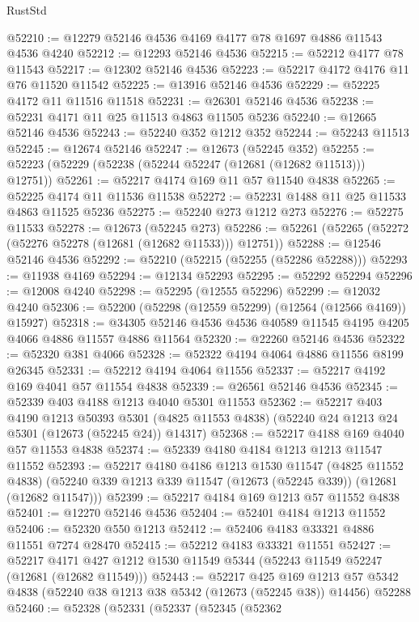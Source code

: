 \begin{lexlean}{RustStd}
\begin{coremodule}
@52210 := @12279 @52146 @4536 @4169 @4177 @78 @1697 @4886 @11543 @4536 @4240
@52212 := @12293 @52146 @4536
@52215 := @52212 @4177 @78 @11543
@52217 := @12302 @52146 @4536
@52223 := @52217 @4172 @4176 @11 @76 @11520 @11542
@52225 := @13916 @52146 @4536
@52229 := @52225 @4172 @11 @11516 @11518
@52231 := @26301 @52146 @4536
@52238 := @52231 @4171 @11 @25 @11513 @4863 @11505 @5236
@52240 := @12665 @52146 @4536
@52243 := @52240 @352 @1212 @352
@52244 := @52243 @11513
@52245 := @12674 @52146
@52247 := @12673 (@52245 @352)
@52255 := @52223 (@52229 (@52238 (@52244 @52247 (@12681 (@12682 @11513))) @12751))
@52261 := @52217 @4174 @169 @11 @57 @11540 @4838
@52265 := @52225 @4174 @11 @11536 @11538
@52272 := @52231 @1488 @11 @25 @11533 @4863 @11525 @5236
@52275 := @52240 @273 @1212 @273
@52276 := @52275 @11533
@52278 := @12673 (@52245 @273)
@52286 := @52261 (@52265 (@52272 (@52276 @52278 (@12681 (@12682 @11533))) @12751))
@52288 := @12546 @52146 @4536
@52292 := @52210 (@52215 (@52255 (@52286 @52288)))
@52293 := @11938 @4169
@52294 := @12134 @52293
@52295 := @52292 @52294
@52296 := @12008 @4240
@52298 := @52295 (@12555 @52296)
@52299 := @12032 @4240
@52306 := @52200 (@52298 (@12559 @52299) (@12564 (@12566 @4169)) @15927)
@52318 := @34305 @52146 @4536 @4536 @40589 @11545 @4195 @4205 @4066 @4886 @11557 @4886 @11564
@52320 := @22260 @52146 @4536
@52322 := @52320 @381 @4066
@52328 := @52322 @4194 @4064 @4886 @11556 @8199 @26345
@52331 := @52212 @4194 @4064 @11556
@52337 := @52217 @4192 @169 @4041 @57 @11554 @4838
@52339 := @26561 @52146 @4536
@52345 := @52339 @403 @4188 @1213 @4040 @5301 @11553
@52362 := @52217
    @403
    @4190
    @1213
    @50393
    @5301
    (@4825 @11553 @4838)
    (@52240 @24 @1213 @24 @5301 (@12673 (@52245 @24)) @14317)
@52368 := @52217 @4188 @169 @4040 @57 @11553 @4838
@52374 := @52339 @4180 @4184 @1213 @1213 @11547 @11552
@52393 := @52217
    @4180
    @4186
    @1213
    @1530
    @11547
    (@4825 @11552 @4838)
    (@52240 @339 @1213 @339 @11547 (@12673 (@52245 @339)) (@12681 (@12682 @11547)))
@52399 := @52217 @4184 @169 @1213 @57 @11552 @4838
@52401 := @12270 @52146 @4536
@52404 := @52401 @4184 @1213 @11552
@52406 := @52320 @550 @1213
@52412 := @52406 @4183 @33321 @4886 @11551 @7274 @28470
@52415 := @52212 @4183 @33321 @11551
@52427 := @52217 @4171 @427 @1212 @1530 @11549 @5344 (@52243 @11549 @52247 (@12681 (@12682 @11549)))
@52443 := @52217
    @425
    @169
    @1213
    @57
    @5342
    @4838
    (@52240 @38 @1213 @38 @5342 (@12673 (@52245 @38)) @14456)
    @52288
@52460 := @52328
    (@52331
      (@52337
        (@52345
          (@52362

\end{coremodule}
\end{lexlean}

